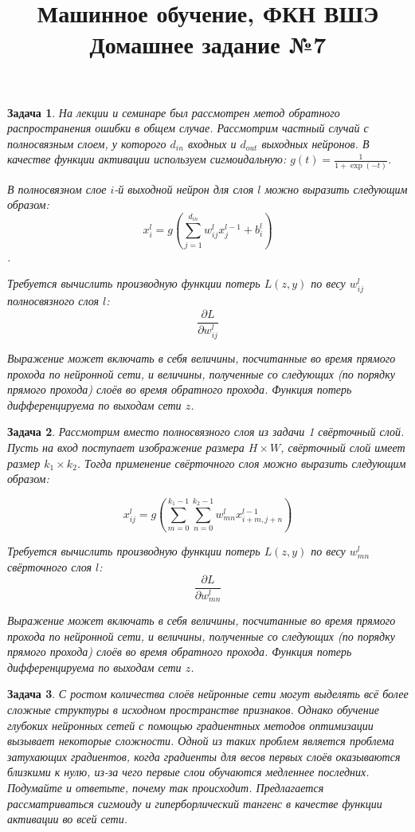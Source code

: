 \documentclass[12pt,fleqn]{article}
\title{Машинное обучение, ФКН ВШЭ\\Домашнее задание №7}
\author{}
\date{}
\newtheorem{esProblem}{Задача}
\begin{document}
    \maketitle
    
    \begin{esProblem}
        На лекции и семинаре был рассмотрен метод обратного распространения ошибки в общем случае. Рассмотрим частный случай с полносвязным слоем, у которого $d_{in}$ входных и $d_{out}$ выходных нейронов. В качестве функции активации используем сигмоидальную: $g(t) = \frac{1}{1+\exp(-t)}$. 

        В полносвязном слое $i$-й выходной нейрон для слоя $l$ можно выразить следующим образом: 
        $$x_i^l = g \left( \sum_{j=1}^{d_{in}} w_{ij}^{l} x_{j}^{l-1} + b_i^l \right)$$.

        Требуется вычислить производную функции потерь $L(z, y)$ по весу $w_{ij}^{l}$ полносвязного слоя $l$: 
        $$\frac{\partial L}{\partial w_{ij}^{l}}$$

        Выражение может включать в себя величины, посчитанные во время прямого прохода по нейронной сети, и величины, полученные со следующих (по порядку прямого прохода) слоёв во время обратного прохода. Функция потерь дифференцируема по выходам сети $z$.
    \end{esProblem}


    \begin{esProblem}
        Рассмотрим вместо полносвязного слоя из задачи 1 свёрточный слой. Пусть на вход поступает изображение размера $H \times W$, свёрточный слой имеет размер $k_1 \times k_2$. Тогда применение свёрточного слоя можно выразить следующим образом:

        $$x_{ij}^l = g \left( \sum_{m=0}^{k_1-1} \sum_{n=0}^{k_2-1} w_{mn}^{l} x_{i+m,j+n}^{l-1} \right)$$

        Требуется вычислить производную функции потерь $L(z, y)$ по весу $w_{mn}^{l}$ свёрточного слоя $l$: 
        $$\frac{\partial L}{\partial w_{mn}^{l}}$$

        Выражение может включать в себя величины, посчитанные во время прямого прохода по нейронной сети, и величины, полученные со следующих (по порядку прямого прохода) слоёв во время обратного прохода. Функция потерь дифференцируема по выходам сети $z$.
    \end{esProblem}
    

    \begin{esProblem}
        С ростом количества слоёв нейронные сети могут выделять всё более сложные структуры в исходном пространстве признаков. Однако обучение глубоких нейронных сетей с помощью градиентных методов оптимизации вызывает некоторые сложности. Одной из таких проблем является проблема затухающих градиентов, когда градиенты для весов первых слоёв оказываются близкими к нулю, из-за чего первые слои обучаются медленнее последних. Подумайте и ответьте, почему так происходит. Предлагается рассматриваться сигмоиду и гиперборлический тангенс в качестве функции активации во всей сети. 
    \end{esProblem}
\end{document}
